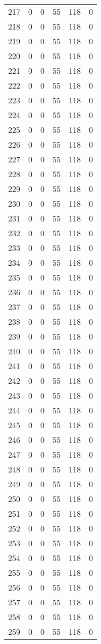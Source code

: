 \documentclass[a4paper]{ctexart}
\begin{document}
\begin{longtable}{p{1cm}|p{2cm}|p{2cm}|p{2cm}|P{2cm}|p{2cm}}
		217&0&0&55&118&0\\
		218&0&0&55&118&0\\
		219&0&0&55&118&0\\
		220&0&0&55&118&0\\
		221&0&0&55&118&0\\
		222&0&0&55&118&0\\
		223&0&0&55&118&0\\
		224&0&0&55&118&0\\
		225&0&0&55&118&0\\
		226&0&0&55&118&0\\
		227&0&0&55&118&0\\
		228&0&0&55&118&0\\
		229&0&0&55&118&0\\
		230&0&0&55&118&0\\
		231&0&0&55&118&0\\
		232&0&0&55&118&0\\
		233&0&0&55&118&0\\
		234&0&0&55&118&0\\
		235&0&0&55&118&0\\
		236&0&0&55&118&0\\
		237&0&0&55&118&0\\
		238&0&0&55&118&0\\
		239&0&0&55&118&0\\
		240&0&0&55&118&0\\
		241&0&0&55&118&0\\
		242&0&0&55&118&0\\
		243&0&0&55&118&0\\
		244&0&0&55&118&0\\
		245&0&0&55&118&0\\
		246&0&0&55&118&0\\
		247&0&0&55&118&0\\
		248&0&0&55&118&0\\
		249&0&0&55&118&0\\
		250&0&0&55&118&0\\
		251&0&0&55&118&0\\
		252&0&0&55&118&0\\
		253&0&0&55&118&0\\
		254&0&0&55&118&0\\
		255&0&0&55&118&0\\
		256&0&0&55&118&0\\
		257&0&0&55&118&0\\
		258&0&0&55&118&0\\
		259&0&0&55&118&0\\

\end{longtable}
\end{document}

